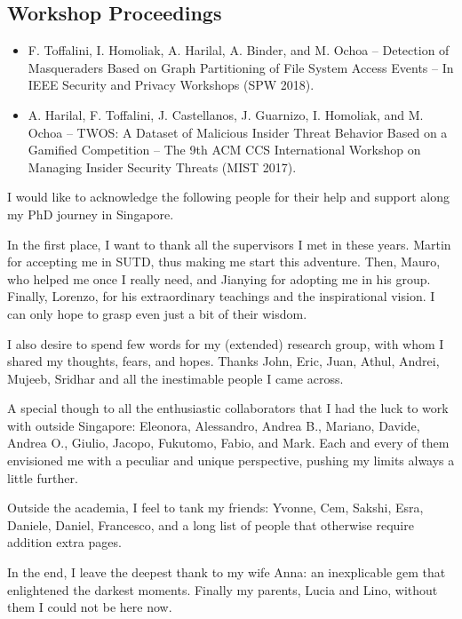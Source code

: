 \documentclass[
11pt, %
oneside, %
english, %
singlespacing, %
headsepline, %
]{MastersDoctoralThesis} %
\begin{document}
\begin{publications}
\section*{Workshop Proceedings}
\begin{itemize}
	
	\item F. Toffalini, I. Homoliak, A. Harilal, A. Binder, and M. Ochoa --  
	Detection of Masqueraders Based on Graph Partitioning of File System 
	Access Events -- In IEEE Security and Privacy Workshops (SPW 2018).
	
	\item A. Harilal, F. Toffalini, J. Castellanos, J. Guarnizo, I. Homoliak,  
	and M. Ochoa -- TWOS: A Dataset of Malicious Insider Threat Behavior Based 
	on a Gamified Competition -- The 9th ACM CCS International Workshop on 
	Managing Insider Security Threats (MIST 2017).	
\end{itemize}


\end{publications}


\begin{acknowledgements}
\addchaptertocentry{\acknowledgementname} %

I would like to acknowledge the following people for their help and support 
along my PhD journey in Singapore.

In the first place, I want to thank all the supervisors I met in these years. 
Martin for accepting me in SUTD, thus making me start this adventure. 
Then, Mauro, who helped me once I really need, and Jianying for adopting me in 
his group.
Finally, Lorenzo, for his extraordinary teachings and the inspirational vision.
I can only hope to grasp even just a bit of their wisdom.

I also desire to spend few words for my (extended) research group, with whom I 
shared my thoughts, fears, and hopes. Thanks John, Eric, Juan, Athul, Andrei, 
Mujeeb, Sridhar and all the inestimable people I came across. 

A special though to all the enthusiastic collaborators that I had the luck to 
work with outside Singapore: Eleonora, Alessandro, Andrea B., Mariano, Davide, 
Andrea O., Giulio, Jacopo, Fukutomo, Fabio, and Mark.
Each and every of them envisioned me with a peculiar and unique perspective, 
pushing my limits always a little further.

Outside the academia, I feel to tank my friends: Yvonne, Cem, Sakshi, 
Esra, Daniele, Daniel, Francesco, and a long list of people that otherwise
require addition extra pages.

In the end, I leave the deepest thank to my wife Anna: an inexplicable gem that 
enlightened the darkest moments. Finally my parents, Lucia and Lino, without 
them I could not be here now.


\end{acknowledgements}
\end{document}
